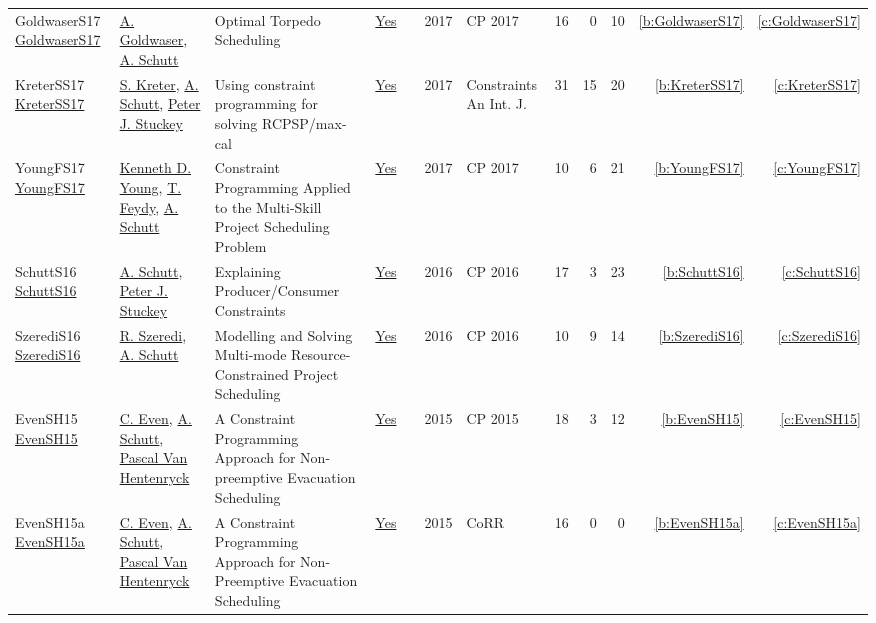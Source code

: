 {\begin{longtable}{>{\raggedright\arraybackslash}p{3cm}>{\raggedright\arraybackslash}p{6cm}>{\raggedright\arraybackslash}p{6.5cm}rrrp{2.5cm}rrrrr}
GoldwaserS17 \href{https://doi.org/10.1007/978-3-319-66158-2\_22}{GoldwaserS17} & \hyperref[auth:a195]{A. Goldwaser}, \hyperref[auth:a125]{A. Schutt} & Optimal Torpedo Scheduling & \href{../works/GoldwaserS17.pdf}{Yes} & \cite{GoldwaserS17} & 2017 & CP 2017 & 16 & 0 & 10 & \ref{b:GoldwaserS17} & \ref{c:GoldwaserS17}\\
KreterSS17 \href{https://doi.org/10.1007/s10601-016-9266-6}{KreterSS17} & \hyperref[auth:a124]{S. Kreter}, \hyperref[auth:a125]{A. Schutt}, \hyperref[auth:a126]{Peter J. Stuckey} & Using constraint programming for solving RCPSP/max-cal & \href{../works/KreterSS17.pdf}{Yes} & \cite{KreterSS17} & 2017 & Constraints An Int. J. & 31 & 15 & 20 & \ref{b:KreterSS17} & \ref{c:KreterSS17}\\
YoungFS17 \href{https://doi.org/10.1007/978-3-319-66158-2\_20}{YoungFS17} & \hyperref[auth:a194]{Kenneth D. Young}, \hyperref[auth:a155]{T. Feydy}, \hyperref[auth:a125]{A. Schutt} & Constraint Programming Applied to the Multi-Skill Project Scheduling Problem & \href{../works/YoungFS17.pdf}{Yes} & \cite{YoungFS17} & 2017 & CP 2017 & 10 & 6 & 21 & \ref{b:YoungFS17} & \ref{c:YoungFS17}\\
SchuttS16 \href{https://doi.org/10.1007/978-3-319-44953-1\_28}{SchuttS16} & \hyperref[auth:a125]{A. Schutt}, \hyperref[auth:a126]{Peter J. Stuckey} & Explaining Producer/Consumer Constraints & \href{../works/SchuttS16.pdf}{Yes} & \cite{SchuttS16} & 2016 & CP 2016 & 17 & 3 & 23 & \ref{b:SchuttS16} & \ref{c:SchuttS16}\\
SzerediS16 \href{https://doi.org/10.1007/978-3-319-44953-1\_31}{SzerediS16} & \hyperref[auth:a206]{R. Szeredi}, \hyperref[auth:a125]{A. Schutt} & Modelling and Solving Multi-mode Resource-Constrained Project Scheduling & \href{../works/SzerediS16.pdf}{Yes} & \cite{SzerediS16} & 2016 & CP 2016 & 10 & 9 & 14 & \ref{b:SzerediS16} & \ref{c:SzerediS16}\\
EvenSH15 \href{https://doi.org/10.1007/978-3-319-23219-5\_40}{EvenSH15} & \hyperref[auth:a220]{C. Even}, \hyperref[auth:a125]{A. Schutt}, \hyperref[auth:a149]{Pascal Van Hentenryck} & A Constraint Programming Approach for Non-preemptive Evacuation Scheduling & \href{../works/EvenSH15.pdf}{Yes} & \cite{EvenSH15} & 2015 & CP 2015 & 18 & 3 & 12 & \ref{b:EvenSH15} & \ref{c:EvenSH15}\\
EvenSH15a \href{http://arxiv.org/abs/1505.02487}{EvenSH15a} & \hyperref[auth:a220]{C. Even}, \hyperref[auth:a125]{A. Schutt}, \hyperref[auth:a149]{Pascal Van Hentenryck} & A Constraint Programming Approach for Non-Preemptive Evacuation Scheduling & \href{../works/EvenSH15a.pdf}{Yes} & \cite{EvenSH15a} & 2015 & CoRR & 16 & 0 & 0 & \ref{b:EvenSH15a} & \ref{c:EvenSH15a}\\

\end{longtable}}
